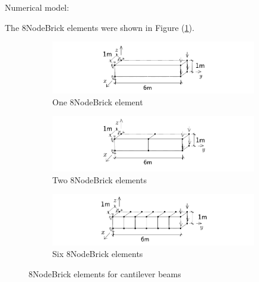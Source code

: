 \documentclass[fleqn,11pt]{article}
\begin{document}
Numerical model:



The 8NodeBrick elements were shown in Figure (\ref{fig 8NodeBrick elements for cantilever beams}).

\begin{figure}[H]
  \centering
  \begin{subfigure}{0.5\textwidth}
    \centering
    \includegraphics[width=9cm]{../Figure-files/beam_8brick_1div.pdf}
    \caption{One 8NodeBrick element}
  \end{subfigure}
  \vskip 8pt
  \begin{subfigure}{0.5\textwidth}
    \centering
    \includegraphics[width=9cm]{../Figure-files/beam_8brick_2div.pdf}
    \caption{Two 8NodeBrick elements}
  \end{subfigure}
  \vskip 8pt
  \begin{subfigure}{0.5\textwidth}
    \centering
    \includegraphics[width=9cm]{../Figure-files/beam_8brick_6div.pdf}
    \caption{Six 8NodeBrick elements}
  \end{subfigure}
  \captionsetup{justification=centering,margin=3cm}
  \caption{8NodeBrick elements for cantilever beams}
  \label{fig 8NodeBrick elements for cantilever beams}
\end{figure}



\end{document}
